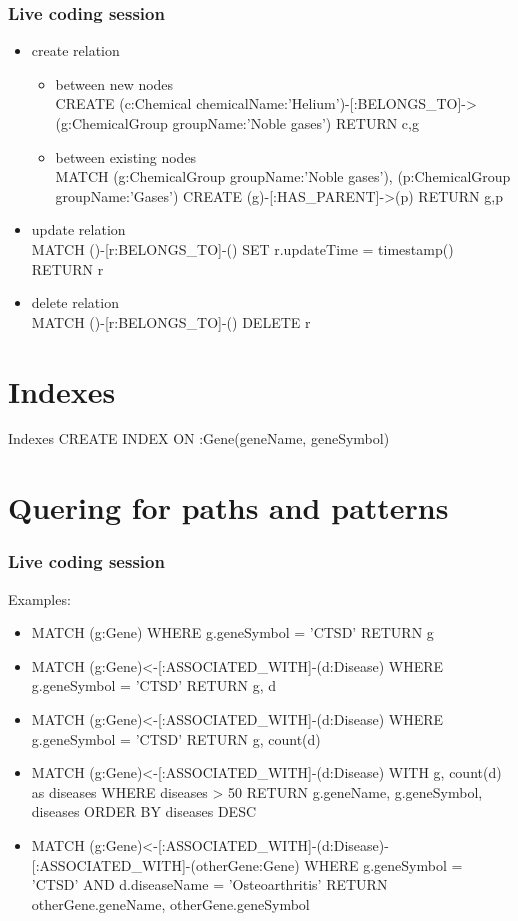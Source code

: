 \documentclass[12pt]{beamer}
\begin{document}
    \begin{frame}
        \frametitle{Live coding session}
        \begin{itemize}
            \item create relation\\
            \begin{itemize}
                \item between new nodes\\
                CREATE (c:Chemical {chemicalName:'Helium'})-[:BELONGS\_TO]->(g:ChemicalGroup {groupName:'Noble gases'}) RETURN c,g
                \item between existing nodes\\
                MATCH (g:ChemicalGroup {groupName:'Noble gases'}), (p:ChemicalGroup {groupName:'Gases'})
                CREATE (g)-[:HAS\_PARENT]->(p) RETURN g,p
            \end{itemize}
            \item update relation\\
            MATCH ()-[r:BELONGS\_TO]-() SET r.updateTime = timestamp() RETURN r\\
            \item delete relation\\
            MATCH ()-[r:BELONGS\_TO]-() DELETE r
        \end{itemize}
    \end{frame}
    
    \section{Indexes}
    \begin{frame}{Indexes}
        CREATE INDEX ON :Gene(geneName, geneSymbol)
    \end{frame}
    
    \section{Quering for paths and patterns}
    \begin{frame}
        \frametitle{Live coding session}
        Examples:
        \begin{itemize}
            \item MATCH (g:Gene) WHERE g.geneSymbol = 'CTSD' RETURN g
            \item MATCH (g:Gene)<-[:ASSOCIATED\_WITH]-(d:Disease) WHERE g.geneSymbol = 'CTSD' RETURN g, d
            \item MATCH (g:Gene)<-[:ASSOCIATED\_WITH]-(d:Disease) WHERE g.geneSymbol = 'CTSD' RETURN g, count(d)
            \item MATCH (g:Gene)<-[:ASSOCIATED\_WITH]-(d:Disease) WITH g, count(d) as diseases WHERE diseases > 50 RETURN g.geneName, g.geneSymbol, diseases ORDER BY diseases DESC\\
            \item MATCH (g:Gene)<-[:ASSOCIATED\_WITH]-(d:Disease)-[:ASSOCIATED\_WITH]-(otherGene:Gene) WHERE g.geneSymbol = 'CTSD' AND d.diseaseName = 'Osteoarthritis' RETURN otherGene.geneName, otherGene.geneSymbol
        \end{itemize}
    \end{frame}
    
\end{document}
